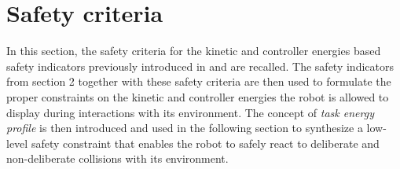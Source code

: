 \documentclass[letterpaper, 10 pt, conference]{ieeeconf}      %
\begin{document}
\section{Safety criteria}
\label{sec:salimval1}
In this section, the safety criteria for the kinetic and controller energies based safety indicators previously introduced in \cite{meguenani2015control} and \cite{meguenani2016energy} are recalled. The safety indicators from section 2 together with these safety criteria are then used to formulate the proper constraints on the kinetic and controller energies the robot is allowed to display during interactions with its environment. The concept of \textit{task energy profile} is then introduced and used in the following section to synthesize a low-level safety constraint that enables the robot to safely react to deliberate and non-deliberate collisions with its environment. 
\end{document}
